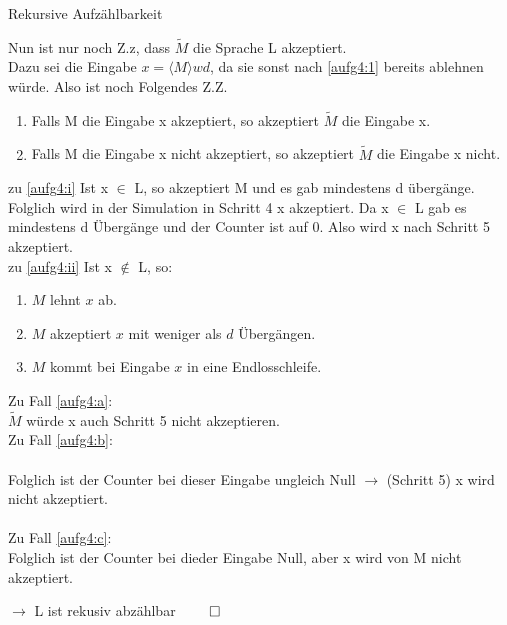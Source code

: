 \documentclass[answers]{submit}
\begin{document}
\begin{exercise}[6]{Rekursive Aufzählbarkeit}
{    Nun ist nur noch Z.z, dass $\tilde{M}$ die Sprache L akzeptiert. \\
    Dazu sei die Eingabe $x=\langle M\rangle wd$, da sie sonst nach \ref{aufg4:1} bereits ablehnen würde. Also ist noch Folgendes Z.Z. \\
    \begin{enumerate}[label=\roman*)]
      \item \label{aufg4:i} Falls M die Eingabe x akzeptiert, so akzeptiert $\tilde{M}$ die Eingabe x.
      \item \label{aufg4:ii} Falls M die Eingabe x nicht akzeptiert, so akzeptiert $\tilde{M}$ die Eingabe x nicht.
    \end{enumerate}

    zu \ref{aufg4:i} Ist x $\in$ L, so akzeptiert M und es gab mindestens d übergänge. Folglich wird in der Simulation in Schritt 4 x akzeptiert. Da x $\in$ L gab es mindestens d Übergänge und der Counter ist auf 0. Also wird x nach Schritt 5 akzeptiert. \\

    zu \ref{aufg4:ii} Ist x $\notin$ L, so:
    \begin{enumerate}[label=\alph*)]
      \item \label{aufg4:a} $M$ lehnt $x$ ab.
      \item \label{aufg4:b} $M$ akzeptiert $x$ mit weniger als $d$ Übergängen.
      \item \label{aufg4:c} $M$ kommt bei Eingabe $x$ in eine Endlosschleife.
    \end{enumerate}

    Zu Fall \ref{aufg4:a}: \\
    $\tilde{M}$ würde x auch Schritt 5 nicht akzeptieren. \\
    Zu Fall \ref{aufg4:b}: \\ \\
    Folglich ist der Counter bei dieser Eingabe ungleich Null $\rightarrow$ (Schritt 5) x wird nicht akzeptiert. \\ \\
    Zu Fall \ref{aufg4:c}: \\
    Folglich ist der Counter bei dieder Eingabe Null, aber x wird von M nicht akzeptiert.

    $\rightarrow$ L ist rekusiv abzählbar $\qed$
  }
\end{exercise}
\end{document}
